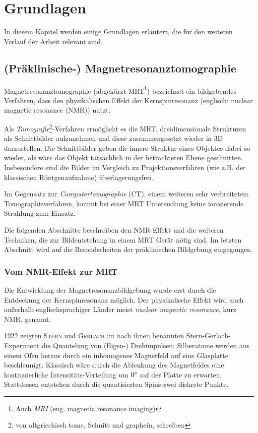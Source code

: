 \chapter{Grundlagen}
In diesem Kapitel werden einige Grundlagen erläutert, die für den weiteren Verlauf der Arbeit relevant sind.

\section{(Präklinische-) Magnetresonanztomographie}
Magnetresonanztomographie (abgekürzt MRT\footnote{Auch \textit{MRI} (eng. magnetic resonance imaging)}) bezeichnet ein bildgebendes Verfahren, dass den physikalischen Effekt der Kernspinresonanz (englisch: nuclear magnetic resonance (NMR)) nutzt.

Als \textit{Tomografie}\footnote{von altgriechisch tome, Schnitt und graphein, schreiben}-Verfahren ermöglicht es die MRT, dreidimensionale Strukturen als Schnittbilder aufzunehmen und diese zusammengesetzt wieder in 3D darzustellen. Die Schnittbilder geben die innere Struktur eines Objektes dabei so wieder, als wäre das Objekt tatsächlich in der betrachteten Ebene geschnitten. Insbesondere sind die Bilder im Vergleich zu Projektionsverfahren (wie z.B. der klassischen Röntgenaufnahme) überlagerungsfrei.

Im Gegensatz zur \textit{Computertomographie} (CT), einem weiteren sehr verbreitetem Tomographieverfahren, kommt bei einer MRT Untersuchung keine ionisierende Strahlung zum Einsatz.

Die folgenden Abschnitte beschreiben den NMR-Effekt und die weiteren Techniken, die zur Bildentstehung in einem MRT Gerät nötig sind. Im letzten Abschnitt wird auf die Besonderheiten der präklinischen Bildgebung eingegangen.

\subsection{Vom NMR-Effekt zur MRT}
Die Entwicklung der Magnetresonanzbildgebung wurde erst durch die Entdeckung der Kernspinresonanz möglich. Der physikalische Effekt wird auch außerhalb englischsprachiger Länder meist \textit{nuclear magnetic resonance}, kurz NMR, genannt.

1922 zeigten \textsc{Stern} und \textsc{Gerlach} im nach ihnen benannten Stern-Gerlach-Experiment die Quantelung von (Eigen-) Drehimpulsen: Silberatome werden aus einem Ofen heraus durch ein inhomogenes Magnetfeld auf eine Glasplatte beschleunigt. Klassisch wäre durch die Ablenkung des Magnetfeldes eine kontinuierliche Intensitäts-Verteilung um $0\degree$ auf der Platte zu erwarten. Stattdessen entstehen durch die quantisierten Spins zwei diskrete Punkte. \cite{Gerlach1922}


